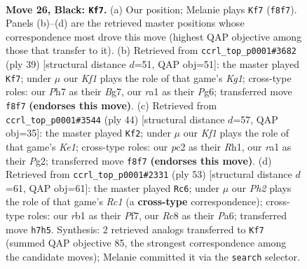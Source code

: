 \documentclass[11pt]{article}
\begin{document}
\clearpage

\begin{figure}[p]\centering
\begin{subfigure}{0.46\textwidth}\centering
\resizebox{\linewidth}{!}{%
\newchessgame
\chessboard[
  setfen={2r2knr/p6p/2p2bp1/8/4BB2/5P1P/PPP2KP1/RR6 b - - 3 26},
  showmover=false,
  pgfstyle=straightmove, color=movearrow, markmove={f8-f7}
]}
\caption{}
\end{subfigure}\hfill
\begin{subfigure}{0.46\textwidth}\centering
\resizebox{\linewidth}{!}{%
\newchessgame
\chessboard[
  setfen={r2r2k1/pp4b1/6pp/3p1p2/8/1P1RB1P1/P3PP1P/5RK1 b - - 3 20},
  showmover=false,
  pgfstyle=straightmove, color=movearrow, markmove={g8-f7}
]}
\caption{}
\end{subfigure}
\\[4pt]
\begin{subfigure}{0.46\textwidth}\centering
\resizebox{\linewidth}{!}{%
\newchessgame
\chessboard[
  setfen={r4rk1/1p3p1p/p3p1b1/6p1/4P3/3B1P2/PP4PP/2R1K2R w K - 3 23},
  showmover=false,
  pgfstyle=straightmove, color=movearrow, markmove={e1-f2}
]}
\caption{}
\end{subfigure}\hfill
\begin{subfigure}{0.46\textwidth}\centering
\resizebox{\linewidth}{!}{%
\newchessgame
\chessboard[
  setfen={r1r5/4kpp1/pp2p2p/7n/3B4/2P5/PP3PPP/R3R1K1 b - - 3 27},
  showmover=false,
  pgfstyle=straightmove, color=movearrow, markmove={c8-c6}
]}
\caption{}
\end{subfigure}
\caption{\textbf{Move 26, Black: \texttt{Kf7}.} (a) Our position; Melanie plays \texttt{Kf7} (\texttt{f8f7}). Panels (b)--(d) are the retrieved master positions whose correspondence most drove this move (highest QAP objective among those that transfer to it). (b) Retrieved from \texttt{ccrl\_top\_p0001\#3682} (ply 39) [structural distance $d$=51, QAP obj=51]: the master played \texttt{Kf7}; under $\mu$ our \emph{Kf1} plays the role of that game's \emph{Kg1}; cross-type roles: our \emph{P}h7 as their \emph{B}g7, our \emph{r}a1 as their \emph{P}g6; transferred move \texttt{f8f7} \textbf{(endorses this move)}. (c) Retrieved from \texttt{ccrl\_top\_p0001\#3544} (ply 44) [structural distance $d$=57, QAP obj=35]: the master played \texttt{Kf2}; under $\mu$ our \emph{Kf1} plays the role of that game's \emph{Ke1}; cross-type roles: our \emph{p}c2 as their \emph{R}h1, our \emph{r}a1 as their \emph{P}g2; transferred move \texttt{f8f7} \textbf{(endorses this move)}. (d) Retrieved from \texttt{ccrl\_top\_p0001\#2331} (ply 53) [structural distance $d$=61, QAP obj=61]: the master played \texttt{Rc6}; under $\mu$ our \emph{Ph2} plays the role of that game's \emph{Rc1} (a \textbf{cross-type} correspondence); cross-type roles: our \emph{r}b1 as their \emph{P}f7, our \emph{R}c8 as their \emph{P}a6; transferred move \texttt{h7h5}. Synthesis: 2 retrieved analogs transferred to \texttt{Kf7} (summed QAP objective 85, the strongest correspondence among the candidate moves); Melanie committed it via the \texttt{search} selector.}
\label{fig:thought-m51}
\end{figure}
\end{document}
